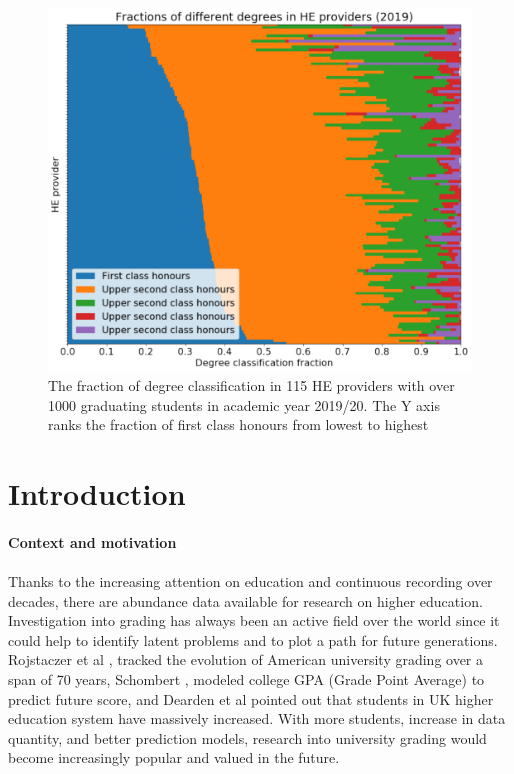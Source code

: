 \documentclass[11pt,a4paper]{article}
\begin{document}
\begin{figure}[h]
    \centering
    \includegraphics[width=15.24cm]{report/Q11FFF.pdf}
    \caption{The fraction of degree classification in 115 HE providers with over 1000 graduating students in academic year 2019/20. The Y axis ranks the fraction of first class honours from lowest to highest}
    \label{fig:Q11F}
\end{figure}


\section{Introduction}

\paragraph{Context and motivation}
\paragraph{}

Thanks to the increasing attention on education and continuous recording over decades, there are abundance data available for research on higher education. Investigation into grading has always been an active field over the world since it could help to identify latent problems and to plot a path for future generations. Rojstaczer et al \cite{Rojstaczer1}, \cite{Rojstaczer2}  tracked the evolution of American university grading over a span of 70 years, Schombert \cite{Schombert1}, \cite{Schombert2} modeled college GPA (Grade Point Average) to predict future score, and Dearden et al \cite{Dearden2011impact} pointed out that students in UK higher education system have massively increased. With more students, increase in data quantity, and better prediction models, research into university grading would become increasingly popular and valued in the future. 
\end{document}
